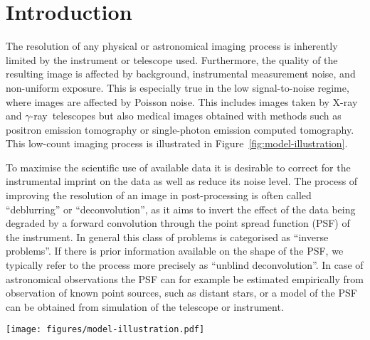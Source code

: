 \documentclass[twocolumn, linenumbers]{aastex631}
\newcommand{\gammaray}{$\gamma$-ray\xspace}
\newcommand{\xray}{X-ray\xspace}
\begin{document}
    \section{Introduction}
    The resolution of any physical or astronomical imaging process is inherently limited by the instrument or telescope used. Furthermore, the quality of the resulting image is affected by background, instrumental measurement noise, and non-uniform exposure. This is especially true in the low signal-to-noise regime, where images are affected by Poisson noise. This includes images taken by \xray and \gammaray~telescopes but also medical images obtained with methods such as positron emission tomography or single-photon emission computed tomography. This low-count imaging process is illustrated in Figure~\ref{fig:model-illustration}.

    To maximise the scientific use of available data it is desirable to correct for the instrumental imprint on the data as well as reduce its noise level. The process of improving the resolution of an image in post-processing is often called \enquote{deblurring} or \enquote{deconvolution}, as it aims to invert the effect of the data being degraded by a forward convolution through the point spread function (PSF) of the instrument. In general this class of problems is categorised as \enquote{inverse problems}. If there is prior information available on the shape of the PSF, we typically refer to the process more precisely as \enquote{unblind deconvolution}. In case of astronomical observations the PSF can for example be estimated empirically from observation of known point sources, such as distant stars, or a model of the PSF can be obtained from simulation of the telescope or instrument.

    \begin{figure*}
        \begin{centering}
            \texttt{[image: figures/model-illustration.pdf]}
            \caption{
                Illustration of the forward model of the low-count imaging process. The flux represents the true unknown flux distribution in the sky. The flux is convolved with an image of the PSF, which represents an estimate of the resolution of the imaging instrument. The exposure consists of the superposition of multiple independent observations with different observation time and pointing position. The exposure weighted flux image is degraded by Poisson noise.
            }
            \label{fig:model-illustration}
        \end{centering}
    \end{figure*}
    
\end{document}

